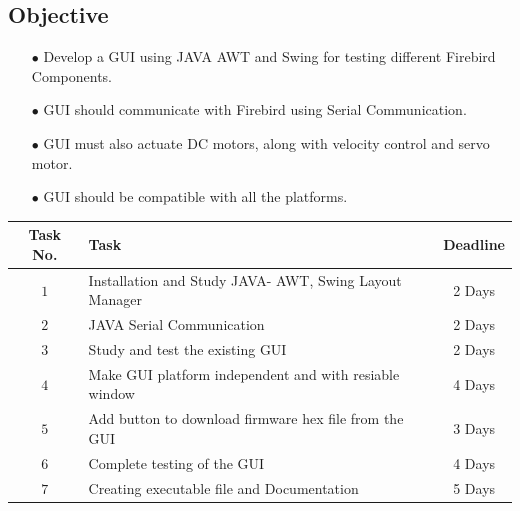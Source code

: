\documentclass[a4paper,12pt,oneside]{book}
\begin{document}
\subsection*{Objective}
	\begin{enumerate}
		\item [$\bullet$] Develop a GUI using JAVA AWT and Swing for testing different Firebird Components.\\
		\item [$\bullet$] GUI should communicate with Firebird using Serial Communication.\\
		\item [$\bullet$] GUI must also actuate DC motors, along with velocity control and servo motor.
		\item [$\bullet$] GUI should be compatible with all the platforms. 
	\end{enumerate}
	\vspace{1cm}
		\begin{center}
	\begin{tabular}{|c|p{2.5in}|c|}
		\hline
		\textbf{Task No.} & \qquad \qquad \qquad \qquad \textbf{Task} & \textbf{Deadline}\\
		\hline
		$1$ & Installation and Study JAVA- AWT, Swing Layout Manager & 2 Days\\
		\hline
		$2$ & JAVA Serial Communication & 2 Days\\
		\hline
		$3$ & Study and test the existing GUI & 2 Days\\
		\hline
		$4$ & Make GUI platform independent and with resiable window & 4 Days\\
		\hline
		$5$ & Add button to download firmware hex file from the GUI & 3 Days\\
		\hline
		$6$ & Complete testing of the GUI & 4 Days\\
		\hline
		$7$ & Creating executable file and Documentation & 5 Days\\
		\hline
	\end{tabular}
	\end{center}
\newpage
\end{document}
